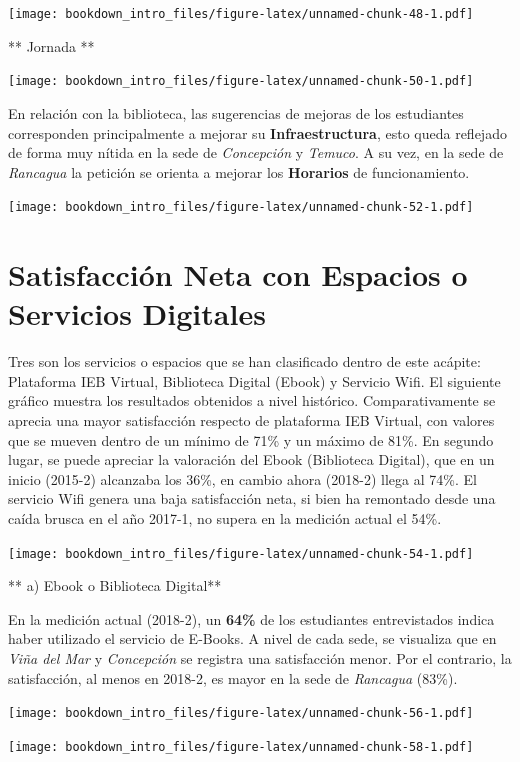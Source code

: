 \documentclass[]{book}
\begin{document}
\texttt{[image: bookdown\_intro\_files/figure-latex/unnamed-chunk-48-1.pdf]}

** Jornada **

\texttt{[image: bookdown\_intro\_files/figure-latex/unnamed-chunk-50-1.pdf]}

En relación con la biblioteca, las sugerencias de mejoras de los
estudiantes corresponden principalmente a mejorar su
\textbf{Infraestructura}, esto queda reflejado de forma muy nítida en la
sede de \emph{Concepción} y \emph{Temuco}. A su vez, en la sede de
\emph{Rancagua} la petición se orienta a mejorar los \textbf{Horarios}
de funcionamiento.

\texttt{[image: bookdown\_intro\_files/figure-latex/unnamed-chunk-52-1.pdf]}

\section{Satisfacción Neta con Espacios o Servicios
Digitales}\label{satisfaccion-neta-con-espacios-o-servicios-digitales}

Tres son los servicios o espacios que se han clasificado dentro de este
acápite: Plataforma IEB Virtual, Biblioteca Digital (Ebook) y Servicio
Wifi. El siguiente gráfico muestra los resultados obtenidos a nivel
histórico. Comparativamente se aprecia una mayor satisfacción respecto
de plataforma IEB Virtual, con valores que se mueven dentro de un mínimo
de 71\% y un máximo de 81\%. En segundo lugar, se puede apreciar la
valoración del Ebook (Biblioteca Digital), que en un inicio (2015-2)
alcanzaba los 36\%, en cambio ahora (2018-2) llega al 74\%. El servicio
Wifi genera una baja satisfacción neta, si bien ha remontado desde una
caída brusca en el año 2017-1, no supera en la medición actual el 54\%.

\texttt{[image: bookdown\_intro\_files/figure-latex/unnamed-chunk-54-1.pdf]}

** a) Ebook o Biblioteca Digital**

En la medición actual (2018-2), un \textbf{64\%} de los estudiantes
entrevistados indica haber utilizado el servicio de E-Books. A nivel de
cada sede, se visualiza que en \emph{Viña del Mar} y \emph{Concepción}
se registra una satisfacción menor. Por el contrario, la satisfacción,
al menos en 2018-2, es mayor en la sede de \emph{Rancagua} (83\%).

\texttt{[image: bookdown\_intro\_files/figure-latex/unnamed-chunk-56-1.pdf]}

\texttt{[image: bookdown\_intro\_files/figure-latex/unnamed-chunk-58-1.pdf]}
\end{document}
